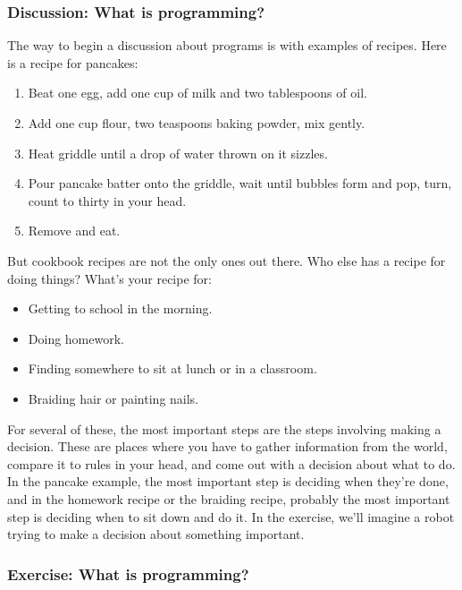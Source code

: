 \documentclass[11pt]{article}
\begin{document}
\subsubsection{Discussion: What is programming?}

The way to begin a discussion about programs is with examples of
recipes.  Here is a recipe for pancakes:

\begin{enumerate}
\item Beat one egg, add one cup of milk and two tablespoons of oil.

\item Add one cup flour, two teaspoons baking powder, mix gently.

\item Heat griddle until a drop of water thrown on it sizzles.

\item Pour pancake batter onto the griddle, wait until bubbles form
  and pop, turn, count to thirty in your head.

\item Remove and eat.
\end{enumerate}

But cookbook recipes are not the only ones out there.  Who else has a
recipe for doing things?  What's your recipe for:

\begin{itemize}
\item Getting to school in the morning.

\item Doing homework.

\item Finding somewhere to sit at lunch or in a classroom.

\item Braiding hair or painting nails.
\end{itemize}

For several of these, the most important steps are the steps involving
making a decision.  These are places where you have to gather
information from the world, compare it to rules in your head, and come
out with a decision about what to do.  In the pancake example, the
most important step is deciding when they're done, and in the homework
recipe or the braiding recipe, probably the most important step is
deciding when to sit down and do it.  In the exercise, we'll imagine a
robot trying to make a decision about something important.


\subsubsection{Exercise: What is programming?}
\end{document}
